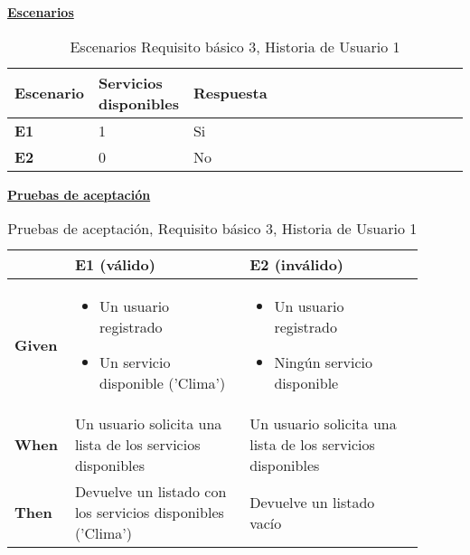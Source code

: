 \documentclass[../ei103948-project-documentation.tex]{subfiles}
\begin{document}
				\begin{center}
					\textbf{\underline{Escenarios}}
					\begin{table}[H]
						\centering
						\begin{tabular}{|p{0.14\linewidth}|p{0.20\linewidth}|p{0.20\linewidth}|p{0.20\linewidth}|p{0.12\linewidth}|p{0.12\linewidth}|p{0.12\linewidth}|}
							\hline
							\textbf{Escenario} & \textbf{Servicios disponibles} & \textbf{Respuesta} \\ \hline
							\textbf{E1}        & 1                              & Si                 \\ \hline
							\textbf{E2}        & 0                              & No                 \\ \hline
							\end{tabular}
						\caption{Escenarios Requisito básico 3, Historia de Usuario 1}
					\end{table}

					\descripcionBasicaU

					\textbf{\underline{Pruebas de aceptación}}
					\begin{table}[H]
						\centering
						\begin{tabular}{|p{0.10\linewidth}|p{0.40\linewidth}|p{0.40\linewidth}|}
							\hline
							\textbf{}      & \textbf{E1 (válido)}                                        & \textbf{E2 (inválido)}                                     \\ \hline
							\textbf{Given} & 
							\begin{itemize}\vspace{-5mm}\setlength\itemsep{0mm}\setlength\parskip{0mm}\setlength{\itemindent}{-5mm}
								\item Un usuario registrado
								\item Un servicio disponible ('Clima')
							\end{itemize}& 
							\begin{itemize}\vspace{-5mm}\setlength\itemsep{0mm}\setlength\parskip{0mm}\setlength{\itemindent}{-5mm}
								\item Un usuario registrado
								\item Ningún servicio disponible
							\end{itemize} \\ \hline
							\textbf{When}  & Un usuario solicita una lista de los servicios disponibles  & Un usuario solicita una lista de los servicios disponibles \\ \hline
							\textbf{Then}  & Devuelve un listado con los servicios disponibles ('Clima') & Devuelve un listado vacío                                  \\ \hline
							\end{tabular}
						\caption{Pruebas de aceptación, Requisito básico 3, Historia de Usuario 1}
					\end{table}
					\end{center}
\end{document}
